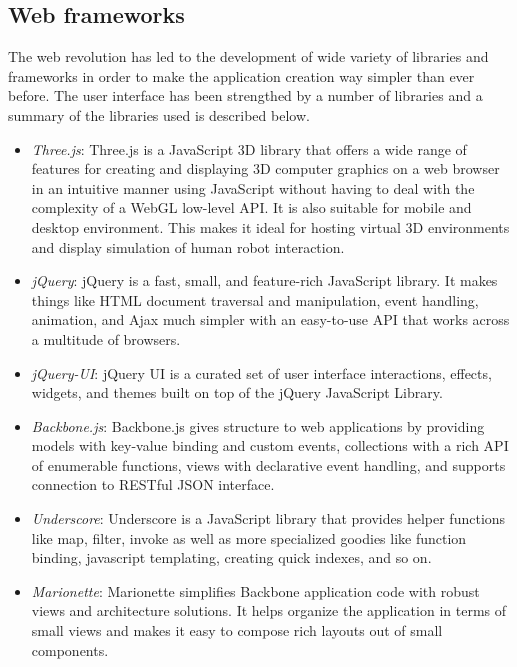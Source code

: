 \subsection{Web frameworks}
The web revolution has led to the development of wide variety of libraries and frameworks in order to make the application creation way simpler than ever before. The user interface has been strengthed by a number of libraries and a summary of the libraries used is described below.
\begin{itemize}[leftmargin={1cm},topsep={0pt},itemsep={0pt},partopsep={0pt},parsep={0pt}] 
\item \emph{Three.js}: Three.js is a JavaScript 3D library that offers a wide range of features for creating and displaying 3D computer graphics on a web browser in an intuitive manner using JavaScript without having to deal with the complexity of a WebGL low-level API. It is also suitable for mobile and desktop environment. This makes it ideal for hosting virtual 3D environments and display simulation of human robot interaction.
\item \emph{jQuery}: jQuery is a fast, small, and feature-rich JavaScript library. It makes things like HTML document traversal and manipulation, event handling, animation, and Ajax much simpler with an easy-to-use API that works across a multitude of browsers. 
\item \emph{jQuery-UI}: jQuery UI is a curated set of user interface interactions, effects, widgets, and themes built on top of the jQuery JavaScript Library. 
\item \emph{Backbone.js}: Backbone.js gives structure to web applications by providing models with key-value binding and custom events, collections with a rich API of enumerable functions, views with declarative event handling, and supports connection to RESTful JSON interface.
\item \emph{Underscore}: Underscore is a JavaScript library that provides helper functions like map, filter, invoke as well as more specialized goodies like function binding, javascript templating, creating quick indexes, and so on.
\item \emph{Marionette}: Marionette simplifies Backbone application code with robust views and architecture solutions. It helps organize the application in terms of small views and makes it easy to compose rich layouts out of small components.
\end{itemize}
